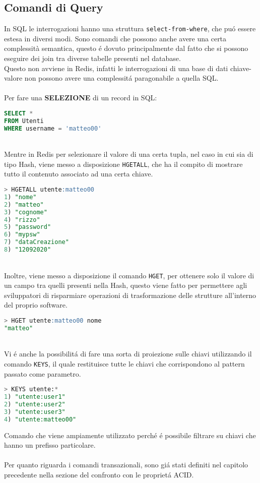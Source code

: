 \subsection{Comandi di Query}
In SQL le interrogazioni hanno una struttura \texttt{select-from-where}, che puó essere estesa in diversi modi. Sono comandi
che possono anche avere una certa complessità semantica, questo é dovuto principalmente dal fatto che si possono eseguire dei join
tra diverse tabelle presenti nel database.\\
Questo non avviene in Redis, infatti le interrogazioni di una base di dati chiave-valore non possono avere una complessitá paragonabile a quella SQL.\\
\\
Per fare una \textbf{SELEZIONE} di un record in SQL:
\begin{lstlisting}[autogobble,style=redis-cli, language=SQL]
SELECT *
FROM Utenti
WHERE username = 'matteo00'\end{lstlisting}
\\
Mentre in Redis per selezionare il valore di una certa tupla, nel caso in cui sia di tipo Hash, viene messo a disposizione \texttt{HGETALL}, che ha il compito di mostrare tutto
il contenuto associato ad una certa chiave.
\begin{lstlisting}[autogobble, style=redis-cli, language=SQL]
> HGETALL utente:matteo00
1) "nome"
2) "matteo"
3) "cognome"
4) "rizzo"
5) "password"
6) "mypsw"
7) "dataCreazione"
8) "12092020"
\end{lstlisting}
\\
Inoltre, viene messo a disposizione il comando \texttt{HGET}, per ottenere solo il valore di un campo tra quelli presenti nella Hash, questo viene fatto per permettere
agli sviluppatori di risparmiare operazioni di trasformazione delle strutture all'interno del proprio software.
\begin{lstlisting}[autogobble, style=redis-cli, language=SQL]
> HGET utente:matteo00 nome
"matteo"
\end{lstlisting}
\\
Vi é anche la possibilitá di fare una sorta di proiezione sulle chiavi utilizzando il comando \texttt{KEYS}, il quale restituisce tutte le chiavi che corrispondono al pattern passato come parametro.
\begin{lstlisting}[autogobble, style=redis-cli, language=SQL]
> KEYS utente:*
1) "utente:user1"
2) "utente:user2"
3) "utente:user3"
4) "utente:matteo00"
\end{lstlisting}
Comando che viene ampiamente utilizzato perché é possibile filtrare su chiavi che hanno un prefisso particolare.\\
\\
Per quanto riguarda i comandi transazionali, sono giá stati definiti nel capitolo precedente nella sezione del confronto con le proprietá ACID.

